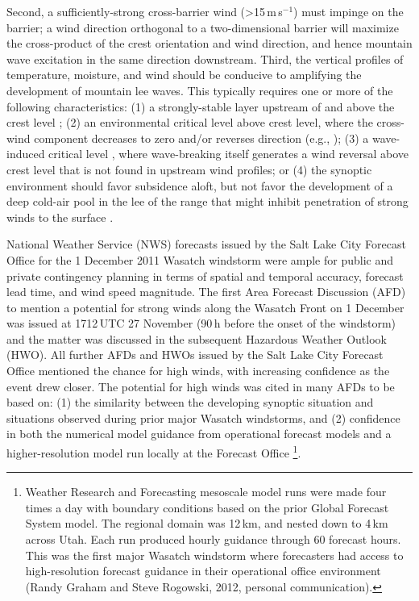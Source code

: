 \documentclass[pdftex,12pt]{article}
\def\mps{m\,s$^{-1}$}
\def\gt{\textgreater}
\begin{document}
Second, a sufficiently-strong cross-barrier wind (\gt 15\,\mps) must impinge on the barrier; a wind direction orthogonal to a two-dimensional barrier will maximize the cross-product of the crest orientation and wind direction, and hence mountain wave excitation in the same direction downstream. Third, the vertical profiles of temperature, moisture, and wind should be conducive to amplifying the development of mountain lee waves. This typically requires one or more of the following characteristics: (1) a strongly-stable layer upstream of and above the crest level \citep{Vosper2004}; (2) an environmental critical level above crest level, where the cross-wind component decreases to zero and/or reverses direction (e.g., \citealt{Wang1999-va}); (3) a wave-induced critical level \citep{Peltier1979}, where wave-breaking itself generates a wind reversal above crest level that is not found in upstream wind profiles; or (4) the synoptic environment should favor subsidence aloft, but not favor the development of a deep cold-air pool in the lee of the range that might inhibit penetration of strong winds to the surface \citep{Jiang2008}. 

National Weather Service (NWS) forecasts issued by the Salt Lake City Forecast Office for the 1 December 2011 Wasatch windstorm were ample for public and private contingency planning in terms of spatial and temporal accuracy, forecast lead time, and wind speed magnitude. The first Area Forecast Discussion (AFD) to mention a potential for strong winds along the Wasatch Front on 1 December was issued at 1712\,UTC 27 November (90\,h before the onset of the windstorm) and the matter was discussed in the subsequent Hazardous Weather Outlook (HWO). All further AFDs and HWOs issued by the Salt Lake City Forecast Office mentioned the chance for high winds, with increasing confidence as the event drew closer. The potential for high winds was cited in many AFDs to be based on: (1) the similarity between the developing synoptic situation and situations observed during prior major Wasatch windstorms, and (2) confidence in both the numerical model guidance from operational forecast models and a higher-resolution model run locally at the Forecast Office \footnote{Weather Research and Forecasting mesoscale model runs were made four times a day with boundary conditions based on the prior Global Forecast System model. The regional domain was 12\,km, and nested down to 4\,km across Utah. Each run produced hourly guidance through 60 forecast hours. This was the first major Wasatch windstorm where forecasters had access to high-resolution forecast guidance in their operational office environment (Randy Graham and Steve Rogowski, 2012, personal communication).}.
\end{document}
